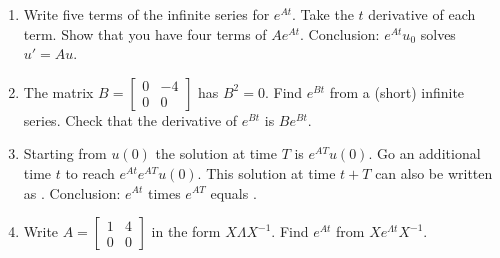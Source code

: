 \documentclass[14pt, a4paper]{article}
\begin{document}
\begin{enumerate}[resume]
    \item Write five terms of the infinite series for $e^{At}$. Take the $t$ derivative of each term. Show that you have four terms of $Ae^{At}$. Conclusion: $e^{At}u_0$ solves $u' = Au$.

    \item The matrix $B = \begin{bmatrix} 0 & -4 \\ 0 & 0 \end{bmatrix}$ has $B^2 = 0$. Find $e^{Bt}$ from a (short) infinite series. Check that the derivative of $e^{Bt}$ is $Be^{Bt}$.

    \item Starting from $u(0)$ the solution at time $T$ is $e^{AT}u(0)$. Go an additional time $t$ to reach $e^{At} e^{AT}u(0)$. This solution at time $t + T$ can also be written as \underline{\hspace{1cm}}. Conclusion: $e^{At}$ times $e^{AT}$ equals \underline{\hspace{1cm}}.

    \item Write $A = \begin{bmatrix} 1 & 4 \\ 0 & 0 \end{bmatrix}$ in the form $X \Lambda X^{-1}$. Find $e^{At}$ from $Xe^{\Lambda t}X^{-1}$.
\end{enumerate}
\end{document}
